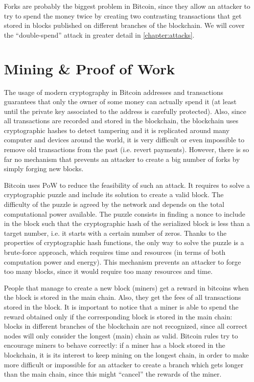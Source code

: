 Forks are probably the biggest problem in Bitcoin, since they allow an attacker to try to spend the money twice by creating two contrasting transactions that get stored in blocks published on different branches of the blockchain.
We will cover the ``double-spend'' attack in greater detail in \cref{chapter:attacks}.

\section{Mining \& Proof of Work}
\label{sec:mining}
The usage of modern cryptography in Bitcoin addresses and transactions guarantees that only the owner of some money can actually spend it (at least until the private key associated to the address is carefully protected).
Also, since all transactions are recorded and stored in the blockchain, the blockchain uses cryptographic hashes to detect tampering and it is replicated around many computer and devices around the world, it is very difficult or even impossible to remove old transactions from the past (i.e. revert payments).
However, there is so far no mechanism that prevents an attacker to create a big number of forks by simply forging new blocks.

\bigskip
Bitcoin uses \ac{PoW} \cite{pow_2002} to reduce the feasibility of such an attack.
It requires to solve a cryptographic puzzle and include its solution to create a valid block.
The difficulty of the puzzle is agreed by the network and depends on the total computational power available.
The puzzle consists in finding a nonce to include in the block such that the cryptographic hash of the serialized block is less than a target number, i.e. it starts with a certain number of zeros.
Thanks to the properties of cryptographic hash functions, the only way to solve the puzzle is a brute-force approach, which requires time and resources (in terms of both computation power and energy).
This mechanism prevents an attacker to forge too many blocks, since it would require too many resources and time.

People that manage to create a new block (miners) get a reward in bitcoins when the block is stored in the main chain.
Also, they get the fees of all transactions stored in the block.
It is important to notice that a miner is able to spend the reward obtained only if the corresponding block is stored in the main chain:
blocks in different branches of the blockchain are not recognized, since all correct nodes will only consider the longest (main) chain as valid.
Bitcoin rules try to encourage miners to behave correctly:
if a miner has a block stored in the blockchain, it is its interest to keep mining on the longest chain, in order to make more difficult or impossible for an attacker to create a branch which gets longer than the main chain, since this might ``cancel'' the rewards of the miner.
